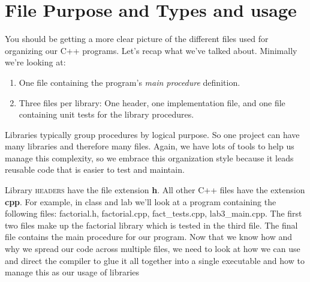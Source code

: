 \documentclass[]{tufte-handout}
\begin{document}
\section{File Purpose and Types and usage}

You should be getting a more clear picture of the different files used for organizing our C++ programs. Let's recap what we've talked about. Minimally we're looking at: 
\begin{enumerate}
\item One file containing the program's \textit{main procedure} definition.
\item Three files per library: One header, one implementation file, and one file containing unit tests for the library procedures.
\end{enumerate}
Libraries typically group procedures by logical purpose. So one project can have many libraries and therefore many files. Again, we have lots of tools to help us manage this complexity, so we embrace this organization style because it leads reusable code that is easier to test and maintain.

Library \textsc{headers} have the file extension \textbf{h}. All other C++ files have the extension \textbf{cpp}.  For example, in class and lab we'll look at a program containing the following files: factorial.h, factorial.cpp, fact\_tests.cpp, lab3\_main.cpp.  The first two files make up the factorial library which is tested in the third file. The final file contains the main procedure for our program. Now that we know how and why we spread our code across multiple files, we need to look at how we can use and direct the compiler to glue it all together into a single executable and how to manage this as our usage of libraries 

 
\end{document}
